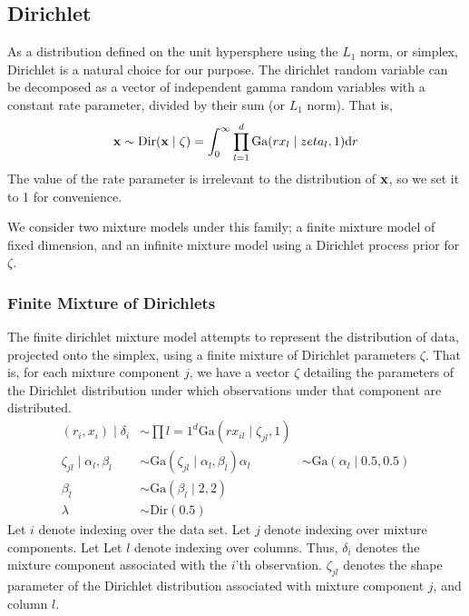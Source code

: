 \subsection{Dirichlet}
As a distribution defined on the unit hypersphere using the $L_1$ norm, or simplex, Dirichlet is a
  natural choice for our purpose.  The dirichlet random variable can be decomposed as a vector of
  independent gamma random variables with a constant rate parameter, divided by their sum
  (or $L_1$ norm). That is,
  \begin{equation}
    \label{eq:dirichletrv}
    {\bf x} \sim \text{Dir}({\bf x} \mid \zeta) = \int_0^{\infty}\prod_{l = 1}^d\text{Ga}(rx_l \mid zeta_l, 1)\text{d}r
  \end{equation}
  The value of the rate parameter is irrelevant to the distribution of ${\bf x}$, so we set it to 1
  for convenience.

We consider two mixture models under this family; a finite mixture model of fixed dimension, and an
  infinite mixture model using a Dirichlet process prior for $\zeta$.

\subsubsection{Finite Mixture of Dirichlets}
The finite dirichlet mixture model attempts to represent the distribution of data, projected onto
  the simplex, using a finite mixture of Dirichlet parameters $\zeta$.  That is, for each mixture
  component $j$, we have a vector $\zeta$ detailing the parameters of the Dirichlet distribution
  under which observations under that component are distributed.
  \begin{equation}
    \begin{aligned}
      (r_i, x_i) \mid \delta_i &\sim \prod{l = 1}^d\text{Ga}(rx_{il}\mid \zeta_{jl}, 1)\\
            \zeta_{jl} \mid \alpha_l,\beta_l &\sim \text{Ga}(\zeta_{jl}\mid \alpha_l, \beta_l)
            \alpha_l &\sim \text{Ga}(\alpha_l \mid 0.5, 0.5)\\
            \beta_l &\sim \text{Ga}(\beta_l \mid 2, 2)\\
            \lambda &\sim \text{Dir}(0.5)
    \end{aligned}
  \end{equation}
  Let $i$ denote indexing over the data set.  Let $j$ denote indexing over mixture components.  Let
  Let $l$ denote indexing over columns. Thus, $\delta_i$ denotes the mixture component associated
  with the $i$'th observation.  $\zeta_{jl}$ denotes the shape parameter of the Dirichlet
  distribution associated with mixture component $j$, and column $l$.


